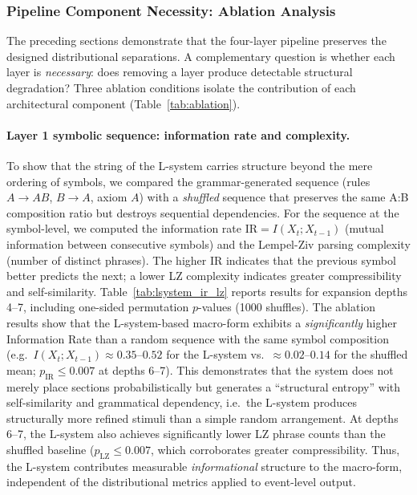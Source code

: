 \documentclass[a4paper]{article}
\theoremstyle{definition}
\theoremstyle{remark}
\begin{document}
\subsubsection{Pipeline Component Necessity: Ablation Analysis}
\label{sec:ablation}

The preceding sections demonstrate that the four-layer pipeline preserves the designed distributional separations. A complementary question is whether each layer is \emph{necessary}: does removing a layer produce detectable structural degradation? Three ablation conditions isolate the contribution of each architectural component (Table~\ref{tab:ablation}).

\paragraph{Layer 1 symbolic sequence: information rate and complexity.}
To show that the string of the L-system carries structure beyond the mere ordering of symbols, we compared the grammar-generated sequence (rules $A \rightarrow AB$, $B \rightarrow A$, axiom $A$) with a \emph{shuffled} sequence that preserves the same A:B composition ratio but destroys sequential dependencies. For the sequence at the symbol-level, we computed the information rate $\mathrm{IR} = I(X_t; X_{t-1})$ (mutual information between consecutive symbols) and the Lempel-Ziv parsing complexity (number of distinct phrases). The higher IR indicates that the previous symbol better predicts the next; a lower LZ complexity indicates greater compressibility and self-similarity. Table~\ref{tab:lsystem_ir_lz} reports results for expansion depths 4--7, including one-sided permutation $p$-values (1000 shuffles). The ablation results show that the L-system-based macro-form exhibits a \emph{significantly} higher Information Rate than a random sequence with the same symbol composition (e.g.\ $I(X_t; X_{t-1}) \approx 0.35$--$0.52$ for the L-system vs.\ ${\approx}0.02$--$0.14$ for the shuffled mean; $p_{\mathrm{IR}} \leq 0.007$ at depths 6--7). This demonstrates that the system does not merely place sections probabilistically but generates a ``structural entropy'' with self-similarity and grammatical dependency, i.e.\ the L-system produces structurally more refined stimuli than a simple random arrangement. At depths 6--7, the L-system also achieves significantly lower LZ phrase counts than the shuffled baseline ($p_{\mathrm{LZ}} \leq 0.007$, which corroborates greater compressibility. Thus, the L-system contributes measurable \emph{informational} structure to the macro-form, independent of the distributional metrics applied to event-level output. 
\end{document}
